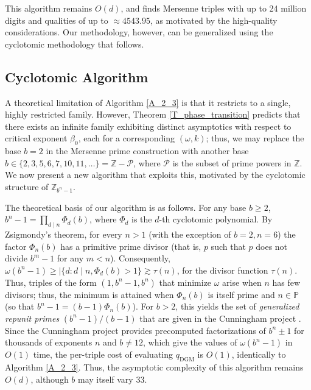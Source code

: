 \documentclass[11pt,letterpaper]{amsart}
\def\Z{\mathbb{Z}}
\def\Z{\mathbb{Z}}
\begin{document}
This algorithm remains $O(d)$, and finds Mersenne triples with up to 24 million digits and qualities of up to $\approx 4543.95$, as motivated by the high-quality considerations. Our methodology, however, can be generalized using the cyclotomic methodology that follows.

\subsection{Cyclotomic Algorithm}\label{S_cyclotomic}

A theoretical limitation of Algorithm \ref{A_2_3} is that it restricts to a single, highly restricted family. However, Theorem \ref{T_phase_transition} predicts that there exists an infinite family exhibiting distinct asymptotics with respect to critical exponent $\beta_0$, each for a corresponding $(\omega,k)$; thus, we may replace the base $b = 2$ in the Mersenne prime construction with another base $b \in \{2, 3, 5, 6, 7, 10, 11, \dotsc\} = \Z - \mathcal{P}$, where $\mathcal{P}$ is the subset of prime powers in $\Z$. We now present a new algorithm that exploits this, motivated by the cyclotomic structure of $\Z_{b^n-1}$.

The theoretical basis of our algorithm is as follows. For any base $b \ge 2$, $b^n - 1 = \prod_{d\mid n} \Phi_d(b)$, where $\Phi_d$ is the $d$-th cyclotomic polynomial. By Zsigmondy's theorem, for every $n>1$ (with the exception of $b=2,n=6$) the factor $\Phi_n(b)$ has a primitive prime divisor (that is, $p$ such that $p$ does not divide $b^m-1$ for any $m<n$). Consequently, $\omega(b^n - 1) \ge |\{d: d \mid n, \Phi_d(b) > 1\} \gtrsim \tau(n)$, for the divisor function $\tau(n)$. Thus, triples of the form $(1,b^n-1,b^n)$ that minimize $\omega$ arise when $n$ has few divisors; thus, the minimum is attained when $\Phi_n(b)$ is itself prime and $n\in\mathbb{P}$ (so that $b^n-1=(b-1)\Phi_n(b)$). For $b > 2$, this yields the set of \emph{generalized repunit primes} $(b^n-1)/(b-1)$ that are given in the Cunningham project \cite{mersennelist}. Since the Cunningham project provides precomputed factorizations of $b^n\pm 1$ for thousands of exponents $n$ and $b \neq 12$, which give the values of $\omega(b^n-1)$ in $O(1)$ time, the per-triple cost of evaluating $q_{\mathrm{DGM}}$ is $O(1)$, identically to Algorithm \ref{A_2_3}. Thus, the asymptotic complexity of this algorithm remains $O(d)$, although $b$ may itself vary   33.
\end{document}
